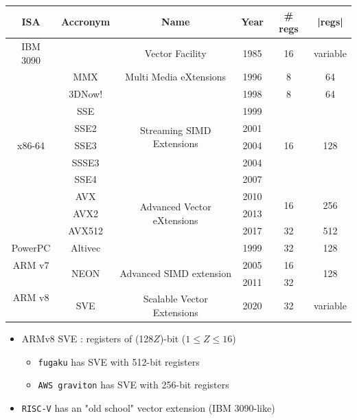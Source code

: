 \documentclass[xcolor={x11names,svgnames}]{beamer}
\newcommand{\red}[1]{{\color{red}#1}}
\begin{document}

\begin{frame}
  \scriptsize
  \begin{tabular}{|c||c|c|c|c|c|}
  \hline
  ISA & Accronym & Name & Year & \# regs & |regs| \\
  \hline  \hline
    IBM 3090 & & Vector Facility & 1985 & 16 & variable \\ 
    \hline  \hline
  \multirow{9}{*}{x86-64} & MMX & Multi Media eXtensions & 1996 & 8 & 64 \\
  \cline{2-6}
  & 3DNow! &                                            & 1998 & 8  &  64 \\
    \cline{2-6}
  & SSE    & \multirow{4}{*}{Streaming SIMD Extensions} & 1999 & \multirow{5}{*}{16} & \multirow{5}{*}{128} \\
  & SSE2   &                           & 2001 &         & \\
  & SSE3   &                           & 2004 &         & \\
  & SSSE3  &                           & 2004 &         & \\
  & SSE4   &                           & 2007 &         & \\
    \cline{2-6}
  & AVX    & \multirow{3}{*}{Advanced Vector eXtensions} & 2010 & \multirow{2}{*}{16} & \multirow{2}{*}{256} \\
  & AVX2   &                           & 2013  &    &     \\
    \cline{2-2}\cline{4-6}
  & AVX512 &                           & 2017  & 32 & 512 \\
  \hline\hline
  PowerPC & Altivec & & 1999 & 32 & 128 \\
  \hline\hline
  ARM v7 & \multirow{2}{*}{NEON} & \multirow{2}{*}{Advanced SIMD extension}    & 2005 & 16 & \multirow{2}{*}{128} \\
  \cline{1-1}%
  \multirow{2}{*}{ARM v8} &      &                            & 2011 & 32 &  \\
  \cline{2-6}
   & SVE  & Scalable Vector Extensions & 2020 & 32 & variable \\
  \hline
\end{tabular}  

  \bigskip

  \normalsize
  \begin{itemize}
  \item ARMv8 SVE : registers of (128$Z$)-bit (\red{$1 \leq Z \leq 16$})
    \begin{itemize}
    \item \texttt{fugaku} has SVE with 512-bit registers
    \item \texttt{AWS graviton} has SVE with 256-bit registers
    \end{itemize}
  \item \texttt{RISC-V} has an "old school" vector extension (IBM 3090-like)
  \end{itemize}
\end{frame}
\end{document}
